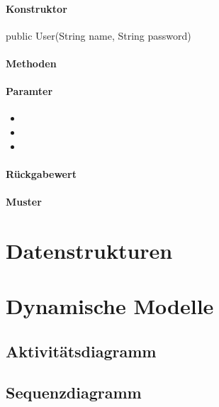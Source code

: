 \documentclass[a4paper]{scrreprt}
\begin{document}
\subsubsection*{Konstruktor}
public User(String name, String password)

\subsubsection*{Methoden}
\begin{addmargin}[25pt]{0pt}

\subsubsection*{Paramter}
\begin{itemize}
\item
\item
\item
\end{itemize}

\subsubsection*{Rückgabewert}
\end{addmargin}
\subsubsection{Muster}


\chapter{Datenstrukturen}

\chapter{Dynamische Modelle}
\section{Aktivitätsdiagramm}

\section{Sequenzdiagramm}
\end{document}
